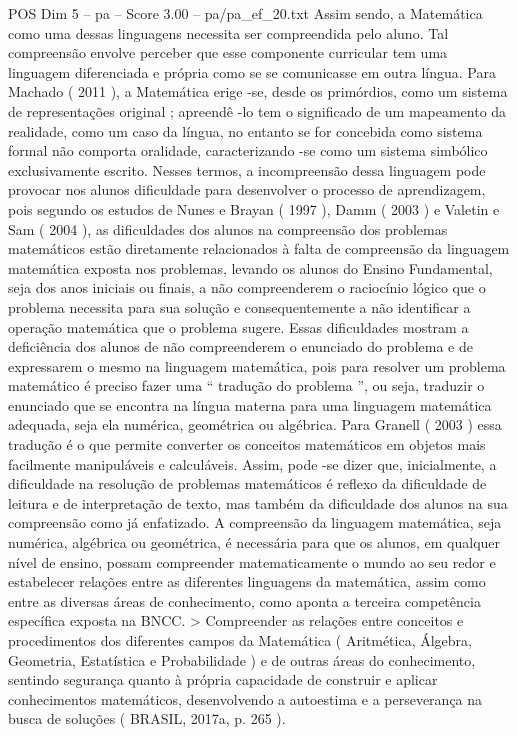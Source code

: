 \begin{textsample}{POS Dim 5 – pa – Score 3.00 – pa/pa\_ef\_20.txt}
Assim sendo, a Matemática como uma dessas linguagens necessita ser compreendida pelo aluno.
Tal compreensão envolve perceber que esse componente curricular tem uma linguagem diferenciada e própria como se se comunicasse em outra língua.
Para Machado ( 2011 ), a Matemática erige -se, desde os primórdios, como um sistema de representações original ; apreendê -lo tem o significado de um mapeamento da realidade, como um caso da língua, no entanto se for concebida como sistema formal não comporta oralidade, caracterizando -se como um sistema simbólico exclusivamente escrito.
Nesses termos, a incompreensão dessa linguagem pode provocar nos alunos dificuldade para desenvolver o processo de aprendizagem, pois segundo os estudos de Nunes e Brayan ( 1997 ), Damm ( 2003 ) e Valetin e Sam ( 2004 ), as dificuldades dos alunos na compreensão dos problemas matemáticos estão diretamente relacionados à falta de compreensão da linguagem matemática exposta nos problemas, levando os alunos do Ensino Fundamental, seja dos anos iniciais ou finais, a não compreenderem o raciocínio lógico que o problema necessita para sua solução e consequentemente a não identificar a operação matemática que o problema sugere.
Essas dificuldades mostram a deficiência dos alunos de não compreenderem o enunciado do problema e de expressarem o mesmo na linguagem matemática, pois para resolver um problema matemático é preciso fazer uma “ tradução do problema ”, ou seja, traduzir o enunciado que se encontra na língua materna para uma linguagem matemática adequada, seja ela numérica, geométrica ou algébrica.
Para Granell ( 2003 ) essa tradução é o que permite converter os conceitos matemáticos em objetos mais facilmente manipuláveis e calculáveis.
Assim, pode -se dizer que, inicialmente, a dificuldade na resolução de problemas matemáticos é reflexo da dificuldade de leitura e de interpretação de texto, mas também da dificuldade dos alunos na sua compreensão como já enfatizado.
A compreensão da linguagem matemática, seja numérica, algébrica ou geométrica, é necessária para que os alunos, em qualquer nível de ensino, possam compreender matematicamente o mundo ao seu redor e estabelecer relações entre as diferentes linguagens da matemática, assim como entre as diversas áreas de conhecimento, como aponta a terceira competência específica exposta na BNCC. > Compreender as relações entre conceitos e procedimentos dos diferentes campos da Matemática ( Aritmética, Álgebra, Geometria, Estatística e Probabilidade ) e de outras áreas do conhecimento, sentindo segurança quanto à própria capacidade de construir e aplicar conhecimentos matemáticos, desenvolvendo a autoestima e a perseverança na busca de soluções ( BRASIL, 2017a, p. 265 ).

\end{textsample}
